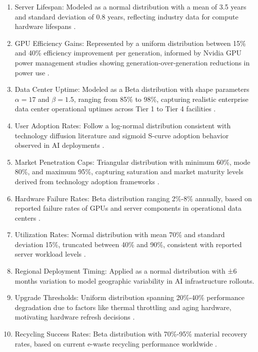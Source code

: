 \documentclass[a4paper, 12pt]{article}
\begin{document}
\begin{enumerate}
    \item Server Lifespan: Modeled as a normal distribution with a mean of 3.5 years and standard deviation of 0.8 years, reflecting industry data for compute hardware lifespans \citep{wang_2024_ewaste}.
    \item GPU Efficiency Gains: Represented by a uniform distribution between 15\% and 40\% efficiency improvement per generation, informed by Nvidia GPU power management studies showing generation-over-generation reductions in power use \citep{nvidia-2023, you-2023}.
    \item Data Center Uptime: Modeled as a Beta distribution with shape parameters $\alpha=17$ and $\beta=1.5$, ranging from 85\% to 98\%, capturing realistic enterprise data center operational uptimes across Tier 1 to Tier 4 facilities \citep{unknown-author-no-date, operations-2024}.
    \item User Adoption Rates: Follow a log-normal distribution consistent with technology diffusion literature and sigmoid S-curve adoption behavior observed in AI deployments \citep{operations-2024, pamplona-2024}.
    \item Market Penetration Caps: Triangular distribution with minimum 60\%, mode 80\%, and maximum 95\%, capturing saturation and market maturity levels derived from technology adoption frameworks \citep{fordyce-2025}.
    \item Hardware Failure Rates: Beta distribution ranging 2\%-8\% annually, based on reported failure rates of GPUs and server components in operational data centers \citep{wang_2024_ewaste}.
    \item Utilization Rates: Normal distribution with mean 70\% and standard deviation 15\%, truncated between 40\% and 90\%, consistent with reported server workload levels \citep{wang_2024_ewaste}.
    \item Regional Deployment Timing: Applied as a normal distribution with ±6 months variation to model geographic variability in AI infrastructure rollouts.
    \item Upgrade Thresholds: Uniform distribution spanning 20\%-40\% performance degradation due to factors like thermal throttling and aging hardware, motivating hardware refresh decisions \citep{you-2023}.
    \item Recycling Success Rates: Beta distribution with 70\%-95\% material recovery rates, based on current e-waste recycling performance worldwide \citep{wang_2024_ewaste}.
\end{enumerate}
\end{document}
